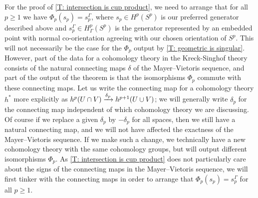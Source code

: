 	For the proof of \cref{T: intersection is cup product}, we need to arrange that for all $p\geq 1$ we have $\Phi_p(s_p) = s_p^\Gamma$, where
	$s_p \in H^p(S^p)$ is our preferred generator described above and $s_p^\Gamma \in H^p_\Gamma(S^p)$ is the generator represented by an embedded point with normal co-orientation agreeing with our chosen orientation of $S^p$.
	This will not necessarily be the case for the $\Phi_p$ output by \cref{T: geometric is singular}.
	However, part of the data for a cohomology theory in the Kreck-Singhof theory consists of the natural connecting maps $\delta$ of the Mayer--Vietoris sequence, and part of the output of the theorem is that the isomorphisms $\Phi_p$ commute with these connecting maps.
	Let us write the connecting map for a cohomology theory $h^*$ more explicitly as $h^p(U \cap V) \xrightarrow{\delta_p}h^{p+1}(U \cup V)$; we will generally write $\delta_p$ for the connecting map independent of which cohomology theory we are discussing.
	Of course if we replace a given $\delta_p$ by $-\delta_p$ for all spaces, then we still have a natural connecting map, and we will not have affected the exactness of the Mayer--Vietoris sequence.
	If we make such a change, we technically have a new cohomology theory with the same cohomology groups, but \cite[Theorem 10]{Krec10b} will output different isomorphisms $\Phi_p$.
	As \cref{T: intersection is cup product} does not particularly care about the signs of the connecting maps in the Mayer--Vietoris sequence, we will first tinker with the connecting maps in order to arrange that $\Phi_p(s_p) = s_p^\Gamma$ for all $p\geq 1$.

